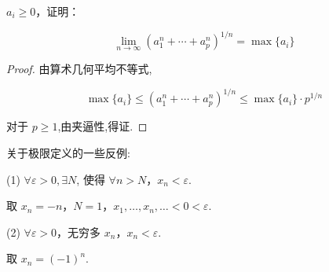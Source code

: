\begin{example}
	
	$a_i \geqslant 0$，证明：
	
	$$ \lim_{n \to \infty} (a_1^n + \cdots + a_p^n)^{1/n} = \max \{a_i\} $$
	
	
	
\end{example}
\begin{proof}
	由算术几何平均不等式,
	
	$$ \max \{a_i\} \leqslant (a_1^n + \cdots + a_p^n)^{1/n} \leqslant \max \{a_i\} \cdot p^{1/n} $$
	
	对于 $p \geqslant 1$,由夹逼性,得证.
\end{proof}
\begin{example}
	关于极限定义的一些反例:
	
	(1) $\forall \varepsilon > 0, \exists N$, 使得 $\forall n > N$，$x_n < \varepsilon$.
	
	取 $x_n = -n$，$N = 1$，$x_1, \ldots, x_n, \ldots < 0 < \varepsilon$.
	
	(2) $\forall \varepsilon > 0$，无穷多 $x_n$，$x_n < \varepsilon$.
	
	取 $x_n = (-1)^n$.
\end{example}

